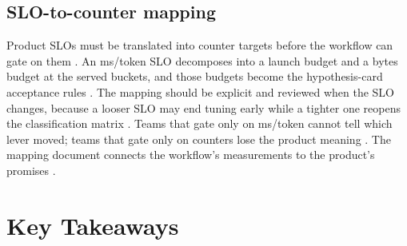 \subsection{SLO-to-counter mapping}

Product SLOs must be translated into counter targets before the workflow can gate on them \citep{patel2025llminference,memoryfloor2026,taxbreak2026}. An ms/token SLO decomposes into a launch budget and a bytes budget at the served buckets, and those budgets become the hypothesis-card acceptance rules \citep{chen2020compilerbasedhardw,patel2025llminference}. The mapping should be explicit and reviewed when the SLO changes, because a looser SLO may end tuning early while a tighter one reopens the classification matrix \citep{memoryfloor2026,taxbreak2026}. Teams that gate only on ms/token cannot tell which lever moved; teams that gate only on counters lose the product meaning \citep{patel2025llminference,memoryfloor2026}. The mapping document connects the workflow's measurements to the product's promises \citep{chen2020compilerbasedhardw,taxbreak2026}.

\section{Key Takeaways}
\label{sec:ch22_key_takeaways}

